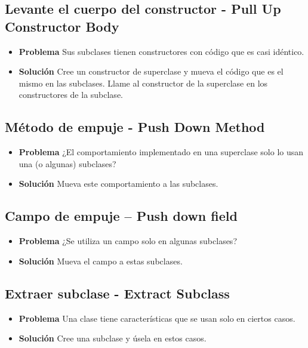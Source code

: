 \documentclass[11pt,a4paper,oneside]{book}
\begin{document}
\subsection{Levante el cuerpo del constructor - Pull Up Constructor Body}
\label{renombrarmetodo}
\begin{itemize}
    \item \textbf{Problema} Sus subclases tienen constructores con código que es casi idéntico.
    \item \textbf{Solución} Cree un constructor de superclase y mueva el código que es el mismo en las subclases. Llame al constructor de la superclase en los constructores de la subclase.
\end{itemize}


\subsection{Método de empuje - Push Down Method}
\label{renombrarmetodo}
\begin{itemize}
    \item \textbf{Problema} ¿El comportamiento implementado en una superclase solo lo usan una (o algunas) subclases?
    \item \textbf{Solución} Mueva este comportamiento a las subclases.
\end{itemize}

\subsection{Campo de empuje – Push down field}
\label{renombrarmetodo}
\begin{itemize}
    \item \textbf{Problema} ¿Se utiliza un campo solo en algunas subclases?
    \item \textbf{Solución} Mueva el campo a estas subclases.
\end{itemize}

\subsection{Extraer subclase - Extract Subclass}
\label{renombrarmetodo}
\begin{itemize}
    \item \textbf{Problema} Una clase tiene características que se usan solo en ciertos casos.
    \item \textbf{Solución} Cree una subclase y úsela en estos casos.
\end{itemize}
\end{document}
